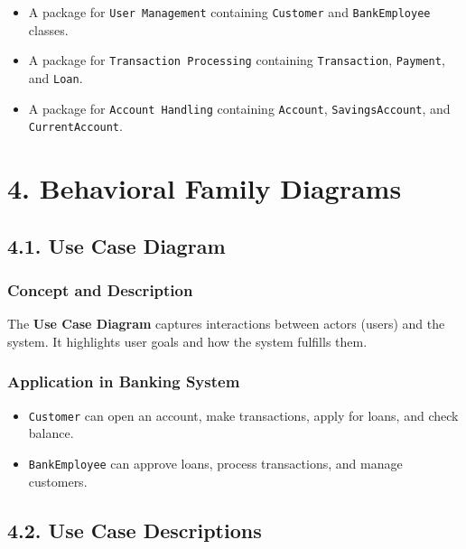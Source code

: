 \begin{itemize}
\item
  A package for \texttt{User\ Management} containing \texttt{Customer}
  and \texttt{BankEmployee} classes.
\item
  A package for \texttt{Transaction\ Processing} containing
  \texttt{Transaction}, \texttt{Payment}, and \texttt{Loan}.
\item
  A package for \texttt{Account\ Handling} containing \texttt{Account},
  \texttt{SavingsAccount}, and \texttt{CurrentAccount}.
\end{itemize}

\section{4. Behavioral Family
Diagrams}\label{behavioral-family-diagrams}

\subsection{4.1. Use Case Diagram}\label{use-case-diagram}

\subsubsection{Concept and Description}\label{concept-and-description-2}

The \textbf{Use Case Diagram} captures interactions between actors
(users) and the system. It highlights user goals and how the system
fulfills them.

\subsubsection{Application in Banking
System}\label{application-in-banking-system-2}

\begin{itemize}
\item
  \texttt{Customer} can open an account, make transactions, apply for
  loans, and check balance.
\item
  \texttt{BankEmployee} can approve loans, process transactions, and
  manage customers.
\end{itemize}

\subsection{4.2. Use Case Descriptions}\label{use-case-descriptions}

